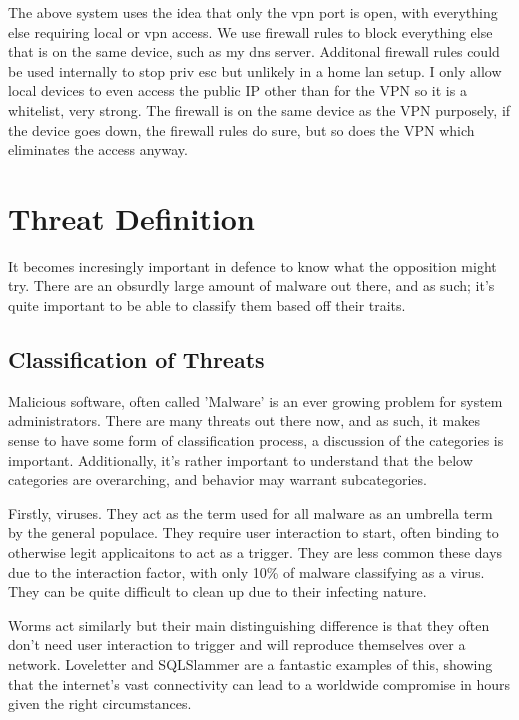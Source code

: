 The above system uses the idea that only the vpn port is open, with everything else requiring local or vpn access. We use firewall rules to block everything else that is on the same device, such as my dns server. Additonal firewall rules could be used internally to stop priv esc 
but unlikely in a home lan setup. I only allow local devices to even access the public IP other than for the VPN so it is a whitelist, very strong. The firewall is on the same device as the VPN purposely, if the device goes down, the firewall rules do sure, but so does the VPN which eliminates the access anyway.


\section{Threat Definition}
It becomes incresingly important in defence to know what the opposition might try. There are an obsurdly large amount of malware out there, and as such; it's quite important to be able to classify them based off their traits.

\subsection{Classification of Threats}
Malicious software, often called 'Malware' is an ever growing problem for system administrators. There are many threats out there now, and as such, it makes sense to have some form of classification process, a discussion of the categories is 
important. Additionally, it's rather important to understand that the below categories are overarching, and behavior may warrant subcategories. \citep{MalwareClass} 

Firstly, viruses. They act as the term used for all malware as an umbrella term by the general populace.
They require user interaction to start, often binding to otherwise legit applicaitons to act as a trigger. They are less common these days due to the interaction factor, with only 10\% of malware classifying as a virus. They can be quite difficult to clean up due to their infecting nature. \citep{MalwareClass}

Worms act similarly but their main distinguishing difference is that they often don't need user interaction to trigger and will reproduce themselves over a network. Loveletter and SQLSlammer are a fantastic examples of this, showing that the internet's vast connectivity
can lead to a worldwide compromise in hours given the right circumstances. \citep{MalwareClass} 

